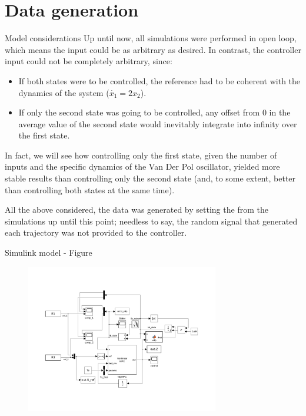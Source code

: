 \documentclass{beamer}
\begin{document}
\section{Data generation}

\begin{frame}{Model considerations}
    Up until now, all simulations were performed in open loop, which means the input could be as arbitrary as desired. In contrast, the controller input could not be completely arbitrary, since:

    \begin{itemize}
        \item If both states were to be controlled, the reference had to be coherent with the dynamics of the system ($\dot{x_1} = 2 x_2$).
        \item If only the second state was going to be controlled, any offset from 0 in the average value of the second state would inevitably integrate into infinity over the first state.
    \end{itemize}

    In fact, we will see how controlling only the first state, given the number of inputs and the specific dynamics of the Van Der Pol oscillator, yielded more stable results than controlling only the second state (and, to some extent, better than controlling both states at the same time).

    All the above considered, the data was generated by setting the  from the simulations up until this point; needless to say, the random signal that generated each trajectory was not provided to the controller.
\end{frame}

\begin{frame}{Simulink model - Figure}
    \begin{figure}[ht!]
        \centering
        \includegraphics[width=0.75\textwidth]{VDP_nonlinear.png}
    \end{figure}
\end{frame}
\end{document}
